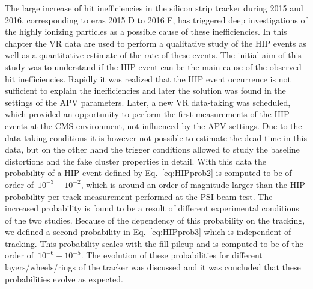 The large increase of hit inefficiencies in the silicon strip tracker during 2015 and 2016, corresponding to eras 2015 D to 2016 F, has triggered deep investigations of the highly ionizing particles as a possible cause of these inefficiencies. In this chapter the VR data are used to perform a qualitative study of the HIP events as well as a quantitative estimate of the rate of these events. The initial aim of this study was to understand if the HIP event can be the main cause of the observed hit inefficiencies. Rapidly it was realized that the HIP event occurrence is not sufficient to explain the inefficiencies and later the solution was found in the settings of the APV parameters. Later, a new VR data-taking was scheduled, which provided an opportunity to perform the first measurements of the HIP events at the CMS environment, not influenced by the APV settings. Due to the data-taking conditions it is however not possible to estimate the dead-time in this data, but on the other hand the trigger conditions allowed to study the baseline distortions and the fake cluster properties in detail. With this data the probability of a HIP event defined by Eq.~\ref{eq:HIPprob2} is computed to be of order of~$10^{-3}-10^{-2}$, which is around an order of magnitude larger than the HIP probability per track measurement performed at the PSI beam test. The increased probability is found to be a result of different experimental conditions of the two studies. Because of the dependency of this probability on the tracking, we defined a second probability in Eq.~\ref{eq:HIPprob3} which is independent of tracking. This probability scales with the fill pileup and is computed to be of the order of~$10^{-6}-10^{-5}$. The evolution of these probabilities for different layers/wheels/rings of the tracker was discussed and it was concluded that these probabilities evolve as expected. %


